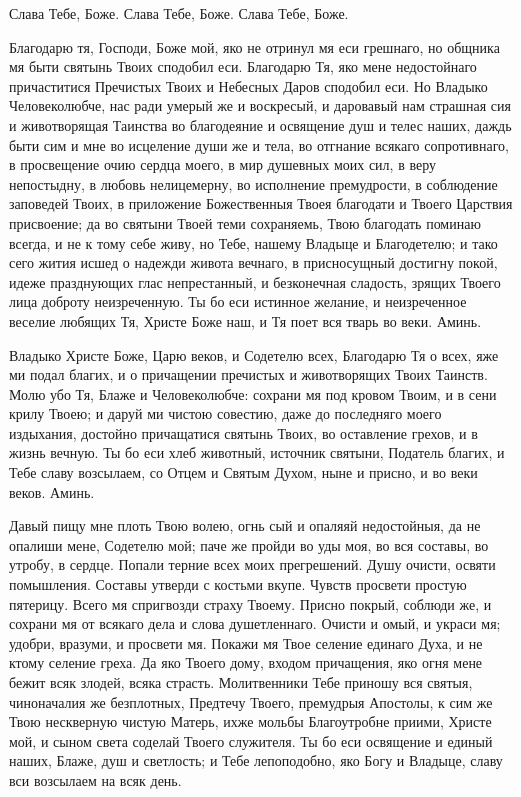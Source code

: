 
Слава Тебе, Боже. Слава Тебе, Боже. Слава Тебе, Боже.




Благодарю тя, Господи, Боже мой, яко не отринул мя еси грешнаго, но общника мя быти святынь Твоих сподобил еси. Благодарю Тя, яко мене недостойнаго причаститися Пречистых Твоих и Небесных Даров сподобил еси. Но Владыко Человеколюбче, нас ради умерый же и воскресый, и даровавый нам страшная сия и животворящая Таинства во благодеяние и освящение душ и телес наших, даждь быти сим и мне во исцеление души же и тела, во отгнание всякаго сопротивнаго, в просвещение очию сердца моего, в мир душевных моих сил, в веру непостыдну, в любовь нелицемерну, во исполнение премудрости, в соблюдение заповедей Твоих, в приложение Божественныя Твоея благодати и Твоего Царствия присвоение; да во святыни Твоей теми сохраняемь, Твою благодать поминаю всегда, и не к тому себе живу, но Тебе, нашему Владыце и Благодетелю; и тако сего жития исшед о надежди живота вечнаго, в присносущный достигну покой, идеже празднующих глас непрестанный, и безконечная сладость, зрящих Твоего лица доброту неизреченную. Ты бо еси истинное желание, и неизреченное веселие любящих Тя, Христе Боже наш, и Тя поет вся тварь во веки. Аминь.




Владыко Христе Боже, Царю веков, и Содетелю всех, Благодарю Тя о всех, яже ми подал благих, и о причащении пречистых и животворящих Твоих Таинств. Молю убо Тя, Блаже и Человеколюбче: сохрани мя под кровом Твоим, и в сени крилу Твоею; и даруй ми чистою совестию, даже до последняго моего издыхания, достойно причащатися святынь Твоих, во оставление грехов, и в жизнь вечную. Ты бо еси хлеб животный, источник святыни, Податель благих, и Тебе славу возсылаем, со Отцем и Святым Духом, ныне и присно, и во веки веков. Аминь.




Давый пищу мне плоть Твою волею, огнь сый и опаляяй недостойныя, да не опалиши мене, Содетелю мой; паче же пройди во уды моя, во вся составы, во утробу, в сердце. Попали терние всех моих прегрешений. Душу очисти, освяти помышления. Составы утверди с костьми вкупе. Чувств просвети простую пятерицу. Всего мя спригвозди страху Твоему. Присно покрый, соблюди же, и сохрани мя от всякаго дела и слова душетленнаго. Очисти и омый, и украси мя; удобри, вразуми, и просвети мя. Покажи мя Твое селение единаго Духа, и не ктому селение греха. Да яко Твоего дому, входом причащения, яко огня мене бежит всяк злодей, всяка страсть. Молитвенники Тебе приношу вся святыя, чиноначалия же безплотных, Предтечу Твоего, премудрыя Апостолы, к сим же Твою нескверную чистую Матерь, ихже мольбы Благоутробне приими, Христе мой, и сыном света соделай Твоего служителя. Ты бо еси освящение и единый наших, Блаже, душ и светлость; и Тебе лепоподобно, яко Богу и Владыце, славу вси возсылаем на всяк день.


